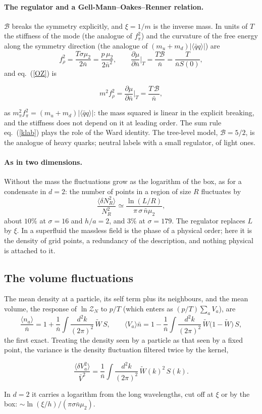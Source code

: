 \documentclass[11pt,aps,preprint,nofootinbib,superscriptaddress,tightenlines]{revtex4-2}
\newcommand{\avg}[1]{\langle #1\rangle}
\newcommand{\klab}{\mathcal B}
\def\st{\begin{equation}}
\def\stp{\end{equation}}
\def\Eq#1{eq.~(\ref{#1})}
\let\oldparagraph\paragraph
\renewcommand{\paragraph}{\par\bigskip\oldparagraph}
\begin{document}
\paragraph{The regulator and a Gell-Mann--Oakes--Renner relation.}  $\klab$ breaks the symmetry explicitly, and $\xi=1/m$ is the inverse mass.  In units of $T$ the
stiffness of the mode (the analogue of $f_\pi^2$) and the curvature of the free energy along the symmetry direction (the analogue of $(m_u+m_d)|\avg{\bar qq}|$) are
\st
f_\rho^2=\frac{T\sigma\mu_2}{2\bar n}=\frac{p\,\mu_2}{2\bar n^2},\qquad \frac{\partial\mu}{\partial\bar n}\Big|_T=\frac{T\klab}{\bar n}=\frac T{\bar nS(0)} ,
\stp
and \Eq{OZ} is
\begin{keyeq}
\st
m^2f_\rho^2=\frac{\partial\mu}{\partial\bar n}\Big|_T=\frac{T\,\klab}{\bar n} ,
\label{gmor}
\stp
\end{keyeq}
as $m_\pi^2f_\pi^2=(m_u+m_d)|\avg{\bar qq}|$: the mass squared is linear in the explicit breaking, and the stiffness does not depend on it at leading order.  The sum rule
\Eq{klab} plays the role of the Ward identity.  The tree-level model, $\klab=5/2$, is the analogue of heavy quarks; neutral labels with a small regulator, of light ones.

\paragraph{As in two dimensions.}  Without the mass the fluctuations grow as the logarithm of the box, as for a condensate in $d=2$: the number of points in a region of
size $R$ fluctuates by
\st
\frac{\avg{\delta N_R^2}}{N_R^2}\simeq\frac{\ln(L/R)}{\pi\,\sigma\,\bar n\mu_2} ,
\stp
about $10\%$ at $\sigma=16$ and $h/a=2$, and $3\%$ at $\sigma=179$.  The regulator replaces $L$ by $\xi$.  In a superfluid the massless field is the phase of a physical
order; here it is the density of grid points, a redundancy of the description, and nothing physical is attached to it.

\subsection{The volume fluctuations}
\label{sec:Vfluct}

The mean density at a particle, its self term plus its neighbours, and the mean volume, the response of $\ln\mathcal Z_N$ to $p/T$ (which enters as $(p/T)\sum_aV_a$),
are
\st
\frac{\avg{n_a}}{\bar n}=1+\frac1{\bar n}\int\frac{d^2k}{(2\pi)^2}\,\widetilde W\,S,\qquad
\avg{V_a}\bar n=1-\frac1{\bar n}\int\frac{d^2k}{(2\pi)^2}\,\widetilde W\big(1-\widetilde W\big)\,S ,
\stp
the first exact.  Treating the density seen by a particle as that seen by a fixed point, the variance is the density fluctuation filtered twice by the kernel,
\begin{keyeq}
\st
\frac{\avg{\delta V_a^2}}{\bar V^2}=\frac1{\bar n}\int\frac{d^2k}{(2\pi)^2}\,\widetilde W(k)^2\,S(k) .
\label{Vvar}
\stp
\end{keyeq}
In $d=2$ it carries a logarithm from the long wavelengths, cut off at $\xi$ or by the box: $\sim\ln(\xi/h)/(\pi\sigma\bar n\mu_2)$.
\end{document}
